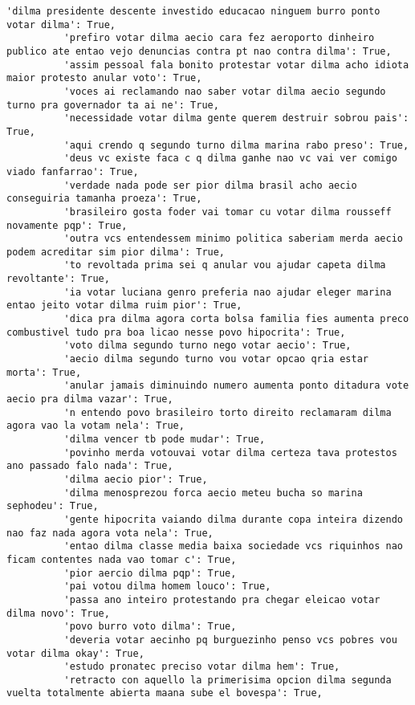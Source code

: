 \documentclass[11pt]{article}
\begin{document}
\begin{Verbatim}[commandchars=\\\{\}]
          'dilma presidente descente investido educacao ninguem burro ponto votar dilma': True,
          'prefiro votar dilma aecio cara fez aeroporto dinheiro publico ate entao vejo denuncias contra pt nao contra dilma': True,
          'assim pessoal fala bonito protestar votar dilma acho idiota maior protesto anular voto': True,
          'voces ai reclamando nao saber votar dilma aecio segundo turno pra governador ta ai ne': True,
          'necessidade votar dilma gente querem destruir sobrou pais': True,
          'aqui crendo q segundo turno dilma marina rabo preso': True,
          'deus vc existe faca c q dilma ganhe nao vc vai ver comigo viado fanfarrao': True,
          'verdade nada pode ser pior dilma brasil acho aecio conseguiria tamanha proeza': True,
          'brasileiro gosta foder vai tomar cu votar dilma rousseff novamente pqp': True,
          'outra vcs entendessem minimo politica saberiam merda aecio podem acreditar sim pior dilma': True,
          'to revoltada prima sei q anular vou ajudar capeta dilma revoltante': True,
          'ia votar luciana genro preferia nao ajudar eleger marina entao jeito votar dilma ruim pior': True,
          'dica pra dilma agora corta bolsa familia fies aumenta preco combustivel tudo pra boa licao nesse povo hipocrita': True,
          'voto dilma segundo turno nego votar aecio': True,
          'aecio dilma segundo turno vou votar opcao qria estar morta': True,
          'anular jamais diminuindo numero aumenta ponto ditadura vote aecio pra dilma vazar': True,
          'n entendo povo brasileiro torto direito reclamaram dilma agora vao la votam nela': True,
          'dilma vencer tb pode mudar': True,
          'povinho merda votouvai votar dilma certeza tava protestos ano passado falo nada': True,
          'dilma aecio pior': True,
          'dilma menosprezou forca aecio meteu bucha so marina sephodeu': True,
          'gente hipocrita vaiando dilma durante copa inteira dizendo nao faz nada agora vota nela': True,
          'entao dilma classe media baixa sociedade vcs riquinhos nao ficam contentes nada vao tomar c': True,
          'pior aercio dilma pqp': True,
          'pai votou dilma homem louco': True,
          'passa ano inteiro protestando pra chegar eleicao votar dilma novo': True,
          'povo burro voto dilma': True,
          'deveria votar aecinho pq burguezinho penso vcs pobres vou votar dilma okay': True,
          'estudo pronatec preciso votar dilma hem': True,
          'retracto con aquello la primerisima opcion dilma segunda vuelta totalmente abierta maana sube el bovespa': True,

\end{Verbatim}
\end{document}
